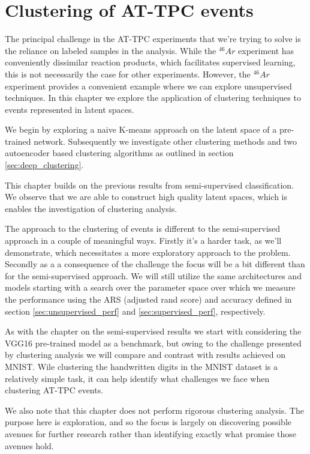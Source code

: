 \chapter{Clustering of AT-TPC events}\label{chap:clustering}

The principal challenge in the AT-TPC experiments that we're trying to solve is the reliance on labeled samples in the analysis. While the ${}^{46}Ar$ experiment has conveniently dissimilar reaction products, which facilitates supervised learning, this is not necessarily the case for other experiments. However, the ${}^{46}Ar$ experiment provides a convenient example where we can explore unsupervised techniques. In this chapter we explore the application of clustering techniques to events represented in latent spaces. 

We begin by exploring a naive K-means approach on the latent space of a pre-trained network. Subsequently we investigate other clustering methods and two autoencoder based clustering algorithms as outlined in section \ref{sec:deep_clustering}.

This chapter builds on the previous results from semi-supervised classification. We observe that we are able to construct high quality latent spaces, which is enables the investigation of clustering analysis. 

The approach to the clustering of events is different to the semi-supervised approach in a couple of meaningful ways. Firstly it's a harder task, as we'll demonstrate, which necessitates a more exploratory approach to the problem. Secondly as a a consequence of the challenge the focus will be a bit different than for the semi-supervised approach. We will still utilize the same architectures and models starting with a search over the parameter space over which we measure the performance using the ARS (adjusted rand score) and accuracy defined in section \ref{sec:unsupervised_perf} and \ref{sec:supervised_perf}, respectively.

As with the chapter on the semi-supervised results we start with considering the VGG16 pre-trained model as a benchmark, but owing to the challenge presented by clustering analysis we will compare and contrast with results achieved on MNIST. Wile clustering the handwritten digits in the MNIST dataset is a relatively simple task, it can help identify what challenges we face when clustering AT-TPC events. 

We also note that this chapter does not perform rigorous clustering analysis. The purpose here is exploration, and so the focus is largely on discovering possible avenues for further research rather than identifying exactly what promise those avenues hold. 